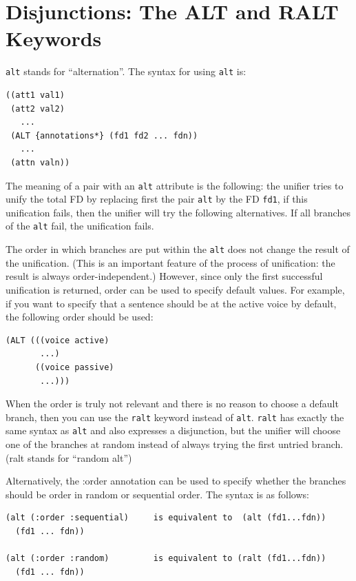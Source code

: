 \documentclass[10pt,a4paper]{report}
\begin{document}
\section{Disjunctions: The ALT and RALT Keywords}
  


{\tt alt} stands for ``alternation''. The syntax for using {\tt alt} is:

\begin{lstlisting}[language=Lisp]
((att1 val1) 
 (att2 val2)
   ... 
 (ALT {annotations*} (fd1 fd2 ... fdn)) 
   ... 
 (attn valn))
\end{lstlisting}

The meaning of a pair with an {\tt alt} attribute is the following: the
unifier tries to unify the total FD by replacing first the pair {\tt alt} by
the FD {\tt fd1}, if this unification fails, then the unifier will try the
following alternatives.  If all branches of the {\tt alt} fail, the
unification fails.

The order in which branches are put within the {\tt alt} does not change the
result of the unification. (This is an important feature of the process
of unification: the result is always order-independent.) 
 
However, since only the first successful unification is returned, order
can be used to specify default values. For example, if you want to specify
that a sentence should be at the active voice by default, the following
order should be used:

\begin{lstlisting}[language=Lisp]
(ALT (((voice active)
       ...)
      ((voice passive)
       ...)))
\end{lstlisting}

When the order is truly not relevant and there is no reason to choose a
default branch, then you can use the {\tt ralt} keyword instead of {\tt alt}.
{\tt ralt} has exactly the same syntax as {\tt alt} and also expresses a
disjunction, but the unifier will choose one of the branches at random
instead of always trying the first untried branch.  (ralt stands for
``random alt'')

Alternatively, the :order annotation can be used to specify whether the
branches should be order in random or sequential order.  The syntax is as
follows:

\begin{lstlisting}[language=Lisp]
(alt (:order :sequential)     is equivalent to  (alt (fd1...fdn))
  (fd1 ... fdn))

(alt (:order :random)         is equivalent to (ralt (fd1...fdn))
  (fd1 ... fdn))

\end{lstlisting}
\end{document}
